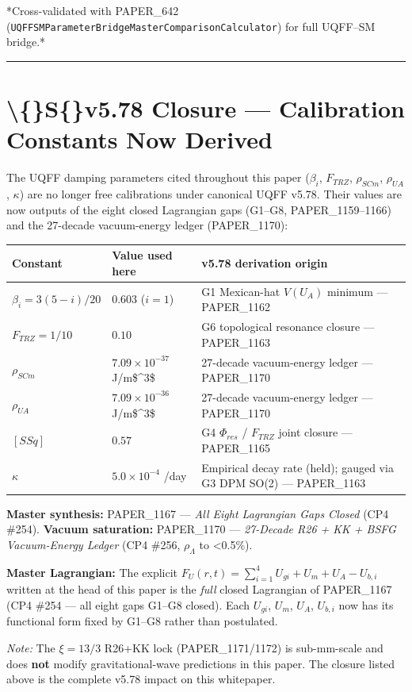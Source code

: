 \documentclass[11pt]{article}
\begin{document}
*Cross-validated with PAPER\_642 (\verb|UQFFSMParameterBridgeMasterComparisonCalculator|) for full UQFF--SM bridge.*

\noindent\rule{\textwidth}{0.4pt}

\section*{\textbackslash\{\}S\{\}v5.78 Closure --- Calibration Constants Now Derived}

The UQFF damping parameters cited throughout this paper ($\beta_i$, $F_{TRZ}$, $\rho_{SCm}$, $\rho_{UA}$, $\kappa$) are no longer free calibrations under canonical UQFF v5.78. Their values are now outputs of the eight closed Lagrangian gaps (G1--G8, PAPER\_1159--1166) and the 27-decade vacuum-energy ledger (PAPER\_1170):

\begin{center}
\begin{longtable}{lll}
\toprule
Constant & Value used here & v5.78 derivation origin \tabularnewline
\midrule
\endhead
$\beta_i = 3(5-i)/20$ & $0.603$ ($i=1$) & G1 Mexican-hat $V(U_A)$ minimum --- PAPER\_1162 \tabularnewline
$F_{TRZ} = 1/10$ & $0.10$ & G6 topological resonance closure --- PAPER\_1163 \tabularnewline
$\rho_{SCm}$ & $7.09\times10^{-37}$ J/m\$\textasciicircum{}3\$ & 27-decade vacuum-energy ledger --- PAPER\_1170 \tabularnewline
$\rho_{UA}$ & $7.09\times10^{-36}$ J/m\$\textasciicircum{}3\$ & 27-decade vacuum-energy ledger --- PAPER\_1170 \tabularnewline
$[SSq]$ & $0.57$ & G4 $\Phi_{res}$ / $F_{TRZ}$ joint closure --- PAPER\_1165 \tabularnewline
$\kappa$ & $5.0\times10^{-4}$ /day & Empirical decay rate (held); gauged via G3 DPM SO(2) --- PAPER\_1163 \tabularnewline
\bottomrule
\end{longtable}
\end{center}

\textbf{Master synthesis:} PAPER\_1167 --- \emph{All Eight Lagrangian Gaps Closed} (CP4 \#254). \textbf{Vacuum saturation:} PAPER\_1170 --- \emph{27-Decade R26 + KK + BSFG Vacuum-Energy Ledger} (CP4 \#256, $\rho_\Lambda$ to <0.5\%).

\textbf{Master Lagrangian:} The explicit $F_U(r,t)=\sum_{i=1}^4 U_{gi}+U_m+U_A-U_{b,i}$ written at the head of this paper is the \emph{full} closed Lagrangian of PAPER\_1167 (CP4 \#254 --- all eight gaps G1--G8 closed). Each $U_{gi}$, $U_m$, $U_A$, $U_{b,i}$ now has its functional form fixed by G1--G8 rather than postulated.

\emph{Note:} The $\xi=13/3$ R26+KK lock (PAPER\_1171/1172) is sub-mm-scale and does \textbf{not} modify gravitational-wave predictions in this paper. The closure listed above is the complete v5.78 impact on this whitepaper.
\end{document}
